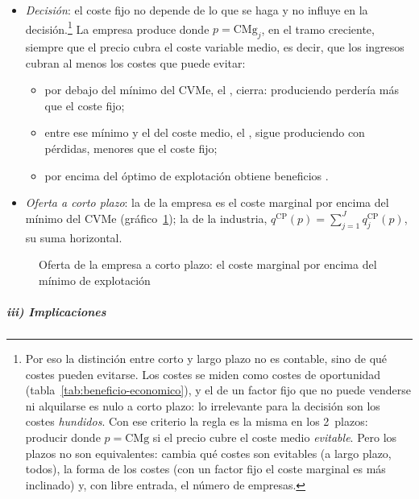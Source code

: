 \documentclass[11pt]{article}
\begin{document}
\begin{itemize}
\item \emph{Decisión}: el coste fijo no depende de lo que se haga y no influye en la decisión.\footnote{Por eso la distinción entre corto y largo plazo no es contable, sino de qué costes pueden evitarse. Los costes se miden como costes de oportunidad (tabla~\ref{tab:beneficio-economico}), y el de un factor fijo que no puede venderse ni alquilarse es nulo a corto plazo: lo irrelevante para la decisión son los costes \emph{hundidos}. Con ese criterio la regla es la misma en los 2~plazos: producir donde $p=\mathrm{CMg}$ si el precio cubre el coste medio \emph{evitable}. Pero los plazos no son equivalentes: cambia qué costes son evitables (a largo plazo, todos), la forma de los costes (con un factor fijo el coste marginal es más inclinado) y, con libre entrada, el número de empresas.} La empresa produce donde $p=\mathrm{CMg}_j$, en el tramo creciente, siempre que el precio cubra el coste variable medio, es decir, que los ingresos cubran al menos los costes que puede evitar:
  \begin{itemize}
  \item por debajo del mínimo del CVMe, el , cierra: produciendo perdería más que el coste fijo;
  \item entre ese mínimo y el del coste medio, el , sigue produciendo con pérdidas, menores que el coste fijo;
  \item por encima del óptimo de explotación obtiene beneficios .
  \end{itemize}
\item \emph{Oferta a corto plazo}: la de la empresa es el coste marginal por encima del mínimo del CVMe (gráfico~\ref{fig:oferta-corto-plazo}); la de la industria, $q^{\mathrm{CP}}(p)=\sum_{j=1}^{J}q_j^{\mathrm{CP}}(p)$, su suma horizontal.
\end{itemize}

\begin{figure}[H]
\centering
\caption{Oferta de la empresa a corto plazo: el coste marginal por encima del mínimo de explotación}\label{fig:oferta-corto-plazo}
\end{figure}

\subparagraph{iii) Implicaciones}
\end{document}
